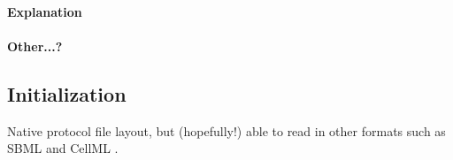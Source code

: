 \documentclass[10pt,letterpaper]{article}
\begin{document}
\paragraph{Explanation}

\paragraph{Other...?}

\subsection*{Initialization}
Native protocol file layout, but (hopefully!) able to read in other formats such as SBML \cite{Hucka2003} and CellML \cite{Cuellar2003}.
\end{document}
